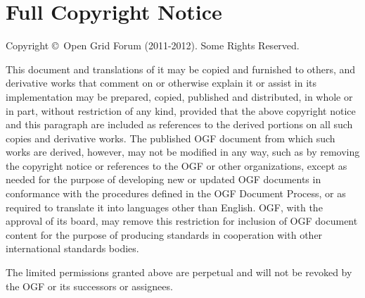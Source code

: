 \documentclass[12pt]{article}  %
\newcommand{\copyrightyears}{2011-2012}  %
\begin{document}
\section*{Full Copyright Notice}

Copyright \copyright \ Open Grid Forum (\copyrightyears). Some Rights Reserved.

This document and translations of it may be copied and furnished to
others, and derivative works that comment on or otherwise explain it
or assist in its implementation may be prepared, copied, published and
distributed, in whole or in part, without restriction of any kind,
provided that the above copyright notice and this paragraph are
included as references to the derived portions on all such copies and
derivative works. The published OGF document from which such works are
derived, however, may not be modified in any way, such as by removing
the copyright notice or references to the OGF or other organizations,
except as needed for the purpose of developing new or updated OGF
documents in conformance with the procedures defined in the OGF
Document Process, or as required to translate it into languages other
than English. OGF, with the approval of its board, may remove this
restriction for inclusion of OGF document content for the purpose of
producing standards in cooperation with other international standards
bodies.

The limited permissions granted above are perpetual and will not be
revoked by the OGF or its successors or assignees.
\end{document}

